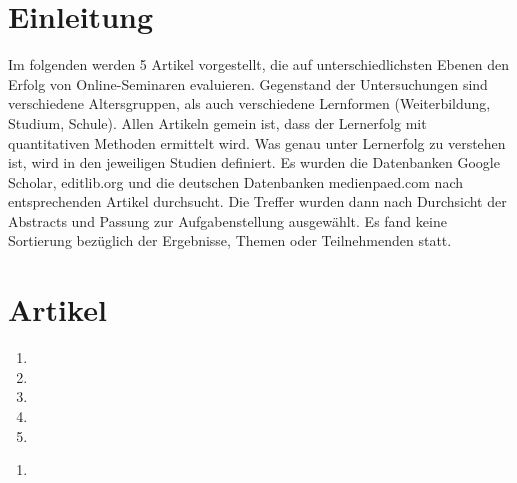 \documentclass[12pt, bibliography=totoc]{scrartcl}
\begin{document}

\tableofcontents
\setcounter{page}{1}
\pagebreak
\section{Einleitung}\label{einleitung}

Im folgenden werden 5 Artikel vorgestellt, die auf unterschiedlichsten
Ebenen den Erfolg von Online-Seminaren evaluieren. Gegenstand der
Untersuchungen sind verschiedene Altersgruppen, als auch verschiedene
Lernformen (Weiterbildung, Studium, Schule). Allen Artikeln gemein ist,
dass der Lernerfolg mit quantitativen Methoden ermittelt wird. Was genau
unter Lernerfolg zu verstehen ist, wird in den jeweiligen Studien
definiert. Es wurden die Datenbanken Google Scholar, editlib.org und die
deutschen Datenbanken medienpaed.com nach entsprechenden Artikel
durchsucht. Die Treffer wurden dann nach Durchsicht der Abstracts und
Passung zur Aufgabenstellung ausgewählt. Es fand keine Sortierung
bezüglich der Ergebnisse, Themen oder Teilnehmenden statt.

\section{Artikel}\label{artikel}

\begin{enumerate}
\def\labelenumi{\arabic{enumi}.}
\item
\item
\item
\item
\item
\end{enumerate}

\pagebreak

\begin{enumerate}
\def\labelenumi{\arabic{enumi}.}
\itemsep1pt\parskip0pt
\item
  \textbf{}
\end{enumerate}
\end{document}
